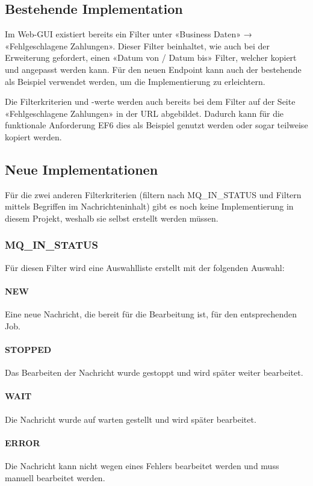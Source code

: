 \subsection{Bestehende Implementation}
Im Web-GUI existiert bereits ein Filter unter «Business Daten» → «Fehlgeschlagene Zahlungen». Dieser Filter beinhaltet, wie auch bei der Erweiterung gefordert, einen «Datum von / Datum bis» Filter, welcher kopiert und angepasst werden kann. Für den neuen Endpoint kann auch der bestehende als Beispiel verwendet werden, um die Implementierung zu erleichtern.

Die Filterkriterien und -werte werden auch bereits bei dem Filter auf der Seite «Fehlgeschlagene Zahlungen» in der URL abgebildet. Dadurch kann für die funktionale Anforderung EF6 dies als Beispiel genutzt werden oder sogar teilweise kopiert werden.

\subsection{Neue Implementationen}
Für die zwei anderen Filterkriterien (filtern nach MQ\_IN\_STATUS und Filtern mittels Begriffen im Nachrichteninhalt) gibt es noch keine Implementierung in diesem Projekt, weshalb sie selbst erstellt werden müssen.

\subsubsection{MQ\_IN\_STATUS}
Für diesen Filter wird eine Auswahlliste erstellt mit der folgenden Auswahl:

\paragraph{NEW} Eine neue Nachricht, die bereit für die Bearbeitung ist, für den entsprechenden Job.
\paragraph{STOPPED} Das Bearbeiten der Nachricht wurde gestoppt und wird später weiter bearbeitet.
\paragraph{WAIT} Die Nachricht wurde auf warten gestellt und wird später bearbeitet.
\paragraph{ERROR} Die Nachricht kann nicht wegen eines Fehlers bearbeitet werden und muss manuell bearbeitet werden.
